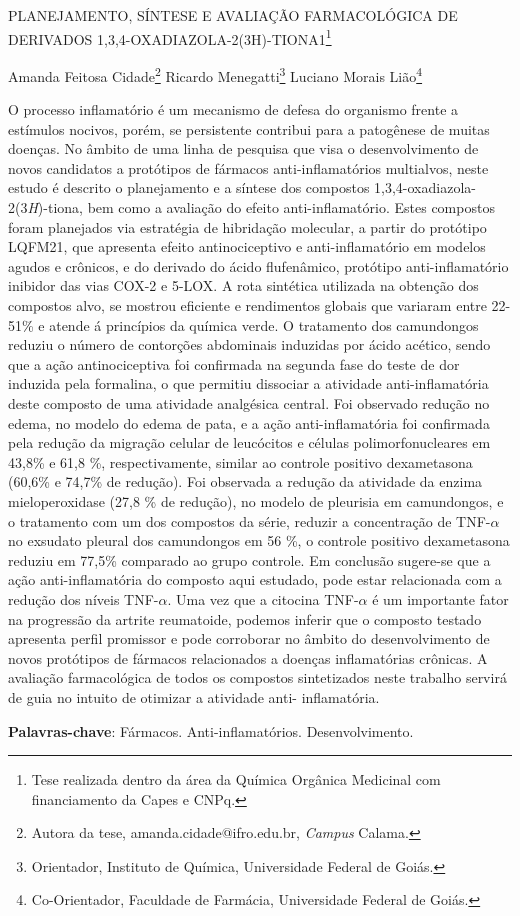 \documentclass[article,12pt,onesidea,4paper,english,brazil]{abntex2}
\begin{document}
	
	
	\frenchspacing 
	
	\begin{center}
		\LARGE PLANEJAMENTO, SÍNTESE E AVALIAÇÃO FARMACOLÓGICA DE DERIVADOS 1,3,4-OXADIAZOLA-2(3H)-TIONA1\footnote{Tese realizada dentro da área da Química Orgânica Medicinal com financiamento da Capes e CNPq.}
		
		\normalsize
		Amanda Feitosa Cidade\footnote{Autora da tese, amanda.cidade@ifro.edu.br, \textit{Campus} Calama.} 
		Ricardo Menegatti\footnote{Orientador, Instituto de Química, Universidade Federal de Goiás.} 
		Luciano Morais Lião\footnote{Co-Orientador, Faculdade de Farmácia, Universidade Federal de Goiás.} 
	\end{center}
	
	\noindent O processo inflamatório é um mecanismo de defesa do organismo frente a estímulos
	nocivos, porém, se persistente contribui para a patogênese de muitas doenças. No
	âmbito de uma linha de pesquisa que visa o desenvolvimento de novos candidatos a
	protótipos de fármacos anti-inflamatórios multialvos, neste estudo é descrito o
	planejamento e a síntese dos compostos 1,3,4-oxadiazola-2(3\textit{H})-tiona, bem como a
	avaliação do efeito anti-inflamatório. Estes compostos foram planejados via
	estratégia de hibridação molecular, a partir do protótipo LQFM21, que apresenta
	efeito antinociceptivo e anti-inflamatório em modelos agudos e crônicos, e do
	derivado do ácido flufenâmico, protótipo anti-inflamatório inibidor das vias COX-2 e
	5-LOX. A rota sintética utilizada na obtenção dos compostos alvo, se mostrou
	eficiente e rendimentos globais que variaram entre 22-51\% e atende á princípios da
	química verde. O tratamento dos camundongos reduziu o número de contorções
	abdominais induzidas por ácido acético, sendo que a ação antinociceptiva foi
	confirmada na segunda fase do teste de dor induzida pela formalina, o que permitiu
	dissociar a atividade anti-inflamatória deste composto de uma atividade analgésica
	central. Foi observado redução no edema, no modelo do edema de pata, e a ação
	anti-inflamatória foi confirmada pela redução da migração celular de leucócitos e
	células polimorfonucleares em 43,8\% e 61,8 \%, respectivamente, similar ao controle
	positivo dexametasona (60,6\% e 74,7\% de redução). Foi observada a redução da
	atividade da enzima mieloperoxidase (27,8 \% de redução), no modelo de pleurisia
	em camundongos, e o tratamento com um dos compostos da série, reduzir a
	concentração de TNF-$\alpha$ no exsudato pleural dos camundongos em 56 \%, o controle
	positivo dexametasona reduziu em 77,5\% comparado ao grupo controle. Em
	conclusão sugere-se que a ação anti-inflamatória do composto aqui estudado, pode
	estar relacionada com a redução dos níveis TNF-$\alpha$. Uma vez que a citocina TNF-$\alpha$ é
	um importante fator na progressão da artrite reumatoide, podemos inferir que o
	composto testado apresenta perfil promissor e pode corroborar no âmbito do
	desenvolvimento de novos protótipos de fármacos relacionados a doenças
	inflamatórias crônicas. A avaliação farmacológica de todos os compostos sintetizados neste trabalho servirá de guia no intuito de otimizar a atividade anti-
	inflamatória.
	
	\vspace{\onelineskip}
	
	\noindent
	\textbf{Palavras-chave}: Fármacos. Anti-inflamatórios. Desenvolvimento.
	
\end{document}
